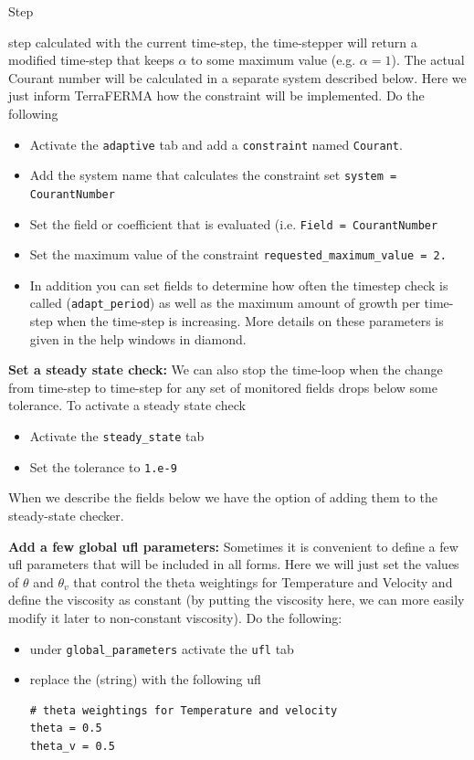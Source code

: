 \begin{steps}{Step}
\begin{steps}{step}
    calculated with the current time-step,  the time-stepper will
    return a modified time-step that keeps $\alpha$ to some maximum
    value (e.g. $\alpha=1$).  The actual Courant number will be calculated in a
    separate system described below.    Here we just inform TerraFERMA how the
    constraint will be implemented.  Do the following
    \begin{itemize}
    \item Activate the
    \texttt{adaptive} tab and add a \texttt{constraint} named
    \texttt{Courant}.
  \item Add the system name that calculates the constraint set
    \texttt{system = CourantNumber}
  \item Set the field or coefficient that is evaluated
    (i.e. \texttt{Field = CourantNumber}
  \item Set the maximum value of the constraint
    \texttt{requested\_maximum\_value = 2.}
  \item In addition you can set fields to determine how often the
    timestep check is called (\texttt{adapt\_period}) as well as the
    maximum amount of growth per time-step when the time-step is
    increasing.  More details on these parameters is given in the help
    windows in diamond.
    \end{itemize}
  \item \textbf{Set a steady state check:} We can also stop the
    time-loop when the change from time-step to time-step for any set
    of monitored fields drops below some tolerance.  To activate a
    steady state check
    \begin{itemize}
    \item Activate the \texttt{steady\_state} tab
    \item Set the tolerance to \texttt{1.e-9}
    \end{itemize}
    When we describe the fields below we have the option of adding
    them to the steady-state checker.
  \end{steps}
\item \textbf{Add a few global ufl parameters:}  Sometimes it is
  convenient to define a few ufl parameters that will be included in
  all forms.  Here we will just set the values of $\theta$ and
  $\theta_{v}$ that control the theta weightings for Temperature and
  Velocity and define the viscosity as constant (by putting the
  viscosity here, we can more easily modify it later to non-constant viscosity).  Do the following:
  \begin{itemize}
  \item under \texttt{global\_parameters} activate the \texttt{ufl} tab
  \item replace the (string) with the following ufl
    \begin{lstlisting}[style=UFL]
# theta weightings for Temperature and velocity
theta = 0.5
theta_v = 0.5


\end{lstlisting}
\end{itemize}
\end{steps}
